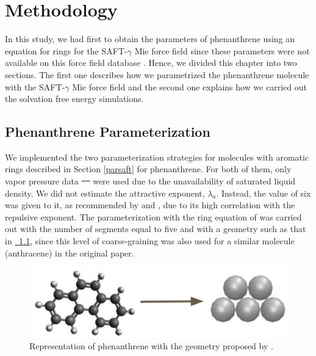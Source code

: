 \documentclass[
	12pt,				%
	openany,			%
	oneside,			%
	a4paper,			%
	english,			%
	brazil				%
	]{abntex2}
\providecommand{\DIFadd}[1]{{\protect\color{blue}\uwave{#1}}}
\providecommand{\DIFdel}[1]{{\protect\color{red}\sout{#1}}}
\providecommand{\DIFaddbegin}{}
\providecommand{\DIFaddend}{}
\providecommand{\DIFdelbegin}{}
\providecommand{\DIFdelend}{}
\providecommand{\DIFaddbeginFL}{}
\providecommand{\DIFaddendFL}{}
\providecommand{\DIFdelbeginFL}{}
\providecommand{\DIFdelendFL}{}
\newcommand{\figref}[2][{}]{\hyperref[#2]{\figurename~\ref{#2}#1}}
\providecommand{\DIFadd}[1]{{\protect\color{blue}\uwave{#1}}} %
\providecommand{\DIFdel}[1]{{\protect\color{red}\sout{#1}}}                      %
\providecommand{\DIFaddbegin}{} %
\providecommand{\DIFaddend}{} %
\providecommand{\DIFdelbegin}{} %
\providecommand{\DIFdelend}{} %
\providecommand{\DIFaddbeginFL}{} %
\providecommand{\DIFaddendFL}{} %
\providecommand{\DIFdelbeginFL}{} %
\providecommand{\DIFdelendFL}{} %
\begin{document}
\chapter{Methodology} %

\label{Chapter4} %

In this study, we had first to obtain the parameters of phenanthrene using an equation for rings for the SAFT-$\gamma$ Mie force field since these parameters were not available on this force field database \cite{ervik2016}. Hence, we divided this chapter into two sections. The first one describes how we parametrized the phenanthrene molecule with the SAFT-$\gamma$ Mie force field and the second one explains how we carried out the solvation free energy simulations. 

\section{Phenanthrene Parameterization}\label{parame}

We implemented the two parameterization strategies for molecules with aromatic rings described in Section \ref{parsaft} for phenanthrene. For both of them, only vapor pressure data \DIFdelbegin \DIFdel{\mbox{%
\cite{pvphen} }%
}\DIFdelend \DIFaddbegin \DIFadd{\mbox{%
\cite{pvphen,osborn} }%
}\DIFaddend were used due to the unavailability of saturated liquid density. We did not estimate the attractive exponent, $\lambda _{a}$. Instead, the value of six was given to it, as recommended by  and , due to its high correlation with the repulsive exponent. The parameterization with the ring equation of  was carried out with the number of segments equal to five and with a geometry such as that in \figref{fig:fen5}, since this level of coarse-graining was also used for a similar molecule (anthracene) in the original paper.
\begin{figure}[th]
	\centering
	\DIFdelbeginFL %
\DIFdelendFL \DIFaddbeginFL \includegraphics[width=0.70\linewidth]{Figures/fe5cg}
	\DIFaddendFL \caption{Representation of phenanthrene with the geometry proposed by . }
	\label{fig:fen5}
\end{figure}
\end{document}
